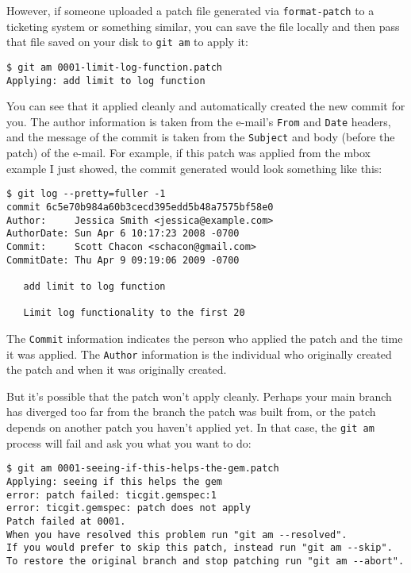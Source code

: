 \documentclass[a4paper]{book}
\begin{document}
However, if someone uploaded a patch file generated via \texttt{format-patch} to a ticketing system or something similar, you can save the file locally and then pass that file saved on your disk to \texttt{git am} to apply it:

\begin{shaded}\begin{verbatim}
$ git am 0001-limit-log-function.patch
Applying: add limit to log function
\end{verbatim}\end{shaded}

You can see that it applied cleanly and automatically created the new commit for you. The author information is taken from the e-mail's \texttt{From} and \texttt{Date} headers, and the message of the commit is taken from the \texttt{Subject} and body (before the patch) of the e-mail. For example, if this patch was applied from the mbox example I just showed, the commit generated would look something like this:

\begin{shaded}\begin{verbatim}
$ git log --pretty=fuller -1
commit 6c5e70b984a60b3cecd395edd5b48a7575bf58e0
Author:     Jessica Smith <jessica@example.com>
AuthorDate: Sun Apr 6 10:17:23 2008 -0700
Commit:     Scott Chacon <schacon@gmail.com>
CommitDate: Thu Apr 9 09:19:06 2009 -0700

   add limit to log function

   Limit log functionality to the first 20
\end{verbatim}\end{shaded}

The \texttt{Commit} information indicates the person who applied the patch and the time it was applied. The \texttt{Author} information is the individual who originally created the patch and when it was originally created.

But it's possible that the patch won't apply cleanly. Perhaps your main branch has diverged too far from the branch the patch was built from, or the patch depends on another patch you haven't applied yet. In that case, the \texttt{git am} process will fail and ask you what you want to do:

\begin{shaded}\begin{verbatim}
$ git am 0001-seeing-if-this-helps-the-gem.patch
Applying: seeing if this helps the gem
error: patch failed: ticgit.gemspec:1
error: ticgit.gemspec: patch does not apply
Patch failed at 0001.
When you have resolved this problem run "git am --resolved".
If you would prefer to skip this patch, instead run "git am --skip".
To restore the original branch and stop patching run "git am --abort".
\end{verbatim}\end{shaded}
\end{document}
